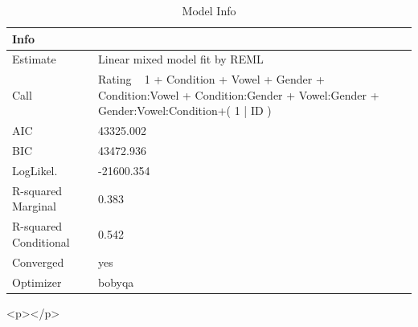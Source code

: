 \documentclass[a4paper,man,hidelinks,floatsintext]{apa7}
\begin{document}
    
\begin{table}[!htbp]
\caption{Model Info}
\label{tab:Table_1}
\begin{adjustbox}{max size={\columnwidth}{\textheight}}
\centering
\begin{tabular}{ll}
\hline
Info                  & ~                                                                                                                               \\
\hline
Estimate              & Linear mixed model fit by REML                                                                                                  \\
Call                  & Rating ~ 1 + Condition + Vowel + Gender + Condition:Vowel + Condition:Gender + Vowel:Gender + Gender:Vowel:Condition+( 1 | ID ) \\
AIC                   & 43325.002                                                                                                                       \\
BIC                   & 43472.936                                                                                                                       \\
LogLikel.             & -21600.354                                                                                                                      \\
R-squared Marginal    & 0.383                                                                                                                           \\
R-squared Conditional & 0.542                                                                                                                           \\
Converged             & yes                                                                                                                             \\
Optimizer             & bobyqa                                                                                                                          \\
\hline
\end{tabular}
\end{adjustbox}
\begin{tablenotes} {
\small
}
\end{tablenotes}
\end{table}
      
        <p></p>
      
\end{document}
